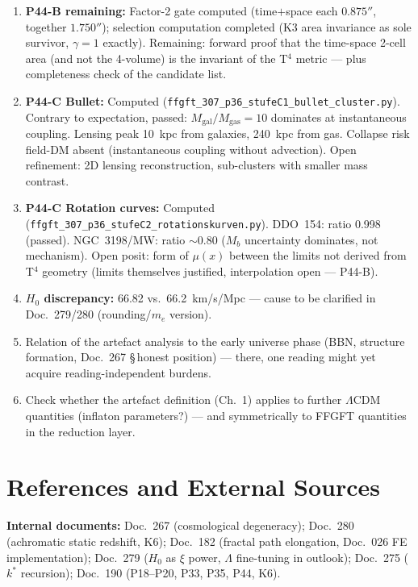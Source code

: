 \begin{enumerate}
  \item \textbf{P44-B remaining:} Factor-2 gate computed (time$+$space
        each $0.875''$, together $1.750''$); selection computation
        completed (K3 area invariance as sole survivor, $\gamma = 1$
        exactly). Remaining: forward proof that the time-space 2-cell
        area (and not the 4-volume) is the invariant of the T$^4$ metric
        — plus completeness check of the candidate list.
  \item \textbf{P44-C Bullet:} Computed
        (\texttt{ffgft\_307\_p36\_stufeC1\_bullet\_cluster.py}).
        Contrary to expectation, passed: $M_\text{gal}/M_\text{gas}=10$
        dominates at instantaneous coupling. Lensing peak 10~kpc from
        galaxies, 240~kpc from gas. Collapse risk field-DM absent
        (instantaneous coupling without advection). Open refinement:
        2D lensing reconstruction, sub-clusters with smaller mass contrast.
  \item \textbf{P44-C Rotation curves:} Computed
        (\texttt{ffgft\_307\_p36\_stufeC2\_rotationskurven.py}).
        DDO~154: ratio 0.998 (passed). NGC~3198/MW: ratio $\sim$0.80
        ($M_b$ uncertainty dominates, not mechanism). Open posit: form
        of $\mu(x)$ between the limits not derived from T$^4$ geometry
        (limits themselves justified, interpolation open — P44-B).
  \item \textbf{$H_0$ discrepancy:} 66.82 vs.\ 66.2~km/s/Mpc —
        cause to be clarified in Doc.~279/280 (rounding/$m_e$ version).
  \item Relation of the artefact analysis to the early universe phase
        (BBN, structure formation, Doc.~267 §\,honest position) — there,
        one reading might yet acquire reading-independent burdens.
  \item Check whether the artefact definition (Ch.~1) applies to further
        $\Lambda$CDM quantities (inflaton parameters?) — and symmetrically
        to FFGFT quantities in the reduction layer.
\end{enumerate}

\chapter{References and External Sources}

\textbf{Internal documents:}
Doc.~267 (cosmological degeneracy);
Doc.~280 (achromatic static redshift, K6);
Doc.~182 (fractal path elongation, Doc.~026 FE implementation);
Doc.~279 ($H_0$ as $\xi$ power, $\Lambda$ fine-tuning in outlook);
Doc.~275 ($k^*$ recursion);
Doc.~190 (P18--P20, P33, P35, P44, K6).

